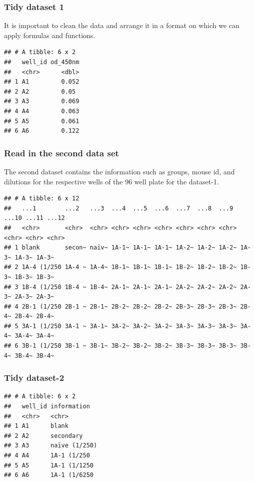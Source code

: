 \documentclass[
]{book}
\begin{document}
\subsubsection{Tidy dataset 1}\label{tidy-dataset-1}

It is important to clean the data and arrange it in a format on which we can apply formulas and functions.

\begin{verbatim}
## # A tibble: 6 x 2
##   well_id od_450nm
##   <chr>      <dbl>
## 1 A1         0.052
## 2 A2         0.05 
## 3 A3         0.069
## 4 A4         0.063
## 5 A5         0.061
## 6 A6         0.122
\end{verbatim}

\subsubsection{Read in the second data set}\label{read-in-the-second-data-set}

The second dataset contains the information such as groups, mouse id, and dilutions for the respective wells of the 96 well plate for the dataset-1.

\begin{verbatim}
## # A tibble: 6 x 12
##   ...1        ...2   ...3  ...4  ...5  ...6  ...7  ...8  ...9  ...10 ...11 ...12
##   <chr>       <chr>  <chr> <chr> <chr> <chr> <chr> <chr> <chr> <chr> <chr> <chr>
## 1 blank       secon~ naïv~ 1A-1~ 1A-1~ 1A-1~ 1A-2~ 1A-2~ 1A-2~ 1A-3~ 1A-3~ 1A-3~
## 2 1A-4 (1/250 1A-4 ~ 1A-4~ 1B-1~ 1B-1~ 1B-1~ 1B-2~ 1B-2~ 1B-2~ 1B-3~ 1B-3~ 1B-3~
## 3 1B-4 (1/250 1B-4 ~ 1B-4~ 2A-1~ 2A-1~ 2A-1~ 2A-2~ 2A-2~ 2A-2~ 2A-3~ 2A-3~ 2A-3~
## 4 2B-1 (1/250 2B-1 ~ 2B-1~ 2B-2~ 2B-2~ 2B-2~ 2B-3~ 2B-3~ 2B-3~ 2B-4~ 2B-4~ 2B-4~
## 5 3A-1 (1/250 3A-1 ~ 3A-1~ 3A-2~ 3A-2~ 3A-2~ 3A-3~ 3A-3~ 3A-3~ 3A-4~ 3A-4~ 3A-4~
## 6 3B-1 (1/250 3B-1 ~ 3B-1~ 3B-2~ 3B-2~ 3B-2~ 3B-3~ 3B-3~ 3B-3~ 3B-4~ 3B-4~ 3B-4~
\end{verbatim}

\subsubsection{Tidy dataset-2}\label{tidy-dataset-2}

\begin{verbatim}
## # A tibble: 6 x 2
##   well_id information  
##   <chr>   <chr>        
## 1 A1      blank        
## 2 A2      secondary    
## 3 A3      naïve (1/250)
## 4 A4      1A-1 (1/250  
## 5 A5      1A-1 (1/1250 
## 6 A6      1A-1 (1/6250
\end{verbatim}
\end{document}
